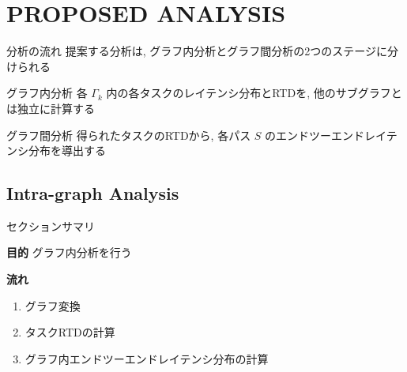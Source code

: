 
\section{PROPOSED ANALYSIS}
\label{sec: proposed analysis}

\begin{frame}{分析の流れ}
    提案する分析は, グラフ内分析とグラフ間分析の2つのステージに分けられる
    \begin{block}{グラフ内分析}
        各 $\Gamma_{k}$ 内の各タスクのレイテンシ分布とRTDを, 他のサブグラフとは独立に計算する
    \end{block}
    \begin{block}{グラフ間分析}
        得られたタスクのRTDから, 各パス $S$ のエンドツーエンドレイテンシ分布を導出する
    \end{block}
\end{frame}


\subsection{Intra-graph Analysis}
\label{ssec: intra-graph analysis}

\begin{frame}{セクションサマリ}
    \begin{itembox}[l]{\textbf{目的}}
        グラフ内分析を行う
    \end{itembox}
    \begin{itembox}[l]{\textbf{流れ}}
        \begin{enumerate}
            \item グラフ変換
            \item タスクRTDの計算
            \item グラフ内エンドツーエンドレイテンシ分布の計算
        \end{enumerate}
    \end{itembox}
\end{frame}

